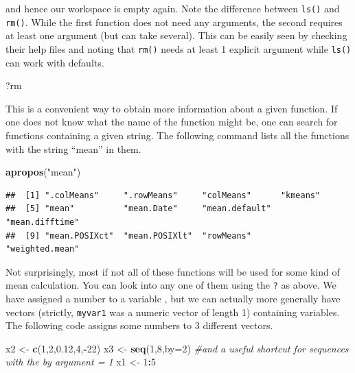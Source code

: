 \documentclass[]{book}
\newenvironment{Shaded}{\begin{snugshade}}{\end{snugshade}}
\newcommand{\KeywordTok}[1]{\textcolor[rgb]{0.13,0.29,0.53}{\textbf{#1}}}
\newcommand{\DataTypeTok}[1]{\textcolor[rgb]{0.13,0.29,0.53}{#1}}
\newcommand{\DecValTok}[1]{\textcolor[rgb]{0.00,0.00,0.81}{#1}}
\newcommand{\FloatTok}[1]{\textcolor[rgb]{0.00,0.00,0.81}{#1}}
\newcommand{\StringTok}[1]{\textcolor[rgb]{0.31,0.60,0.02}{#1}}
\newcommand{\CommentTok}[1]{\textcolor[rgb]{0.56,0.35,0.01}{\textit{#1}}}
\newcommand{\OperatorTok}[1]{\textcolor[rgb]{0.81,0.36,0.00}{\textbf{#1}}}
\newcommand{\NormalTok}[1]{#1}
\theoremstyle{definition}
\theoremstyle{definition}
\theoremstyle{remark}
\begin{document}
and hence our workspace is empty again. Note the difference between
\texttt{ls()} and \texttt{rm()}. While the first function does not need
any arguments, the second requires at least one argument (but can take
several). This can be easily seen by checking their help files and
noting that \texttt{rm()} needs at least 1 explicit argument while
\texttt{ls()} can work with defaults.

\begin{Shaded}
\begin{Highlighting}[]
\NormalTok{?rm}
\end{Highlighting}
\end{Shaded}

This is a convenient way to obtain more information about a given
function. If one does not know what the name of the function might be,
one can search for functions containing a given string. The following
command lists all the functions with the string ``mean'' in them.

\begin{Shaded}
\begin{Highlighting}[]
\KeywordTok{apropos}\NormalTok{(}\StringTok{"mean"}\NormalTok{)}
\end{Highlighting}
\end{Shaded}

\begin{verbatim}
##  [1] ".colMeans"     ".rowMeans"     "colMeans"      "kmeans"       
##  [5] "mean"          "mean.Date"     "mean.default"  "mean.difftime"
##  [9] "mean.POSIXct"  "mean.POSIXlt"  "rowMeans"      "weighted.mean"
\end{verbatim}

Not surprisingly, most if not all of these functions will be used for
some kind of mean calculation. You can look into any one of them using
the \texttt{?} as above. We have assigned a number to a variable , but
we can actually more generally have vectors (strictly, \texttt{myvar1}
was a numeric vector of length 1) containing variables. The following
code assigns some numbers to 3 different vectors.

\begin{Shaded}
\begin{Highlighting}[]
\NormalTok{x2 <-}\StringTok{ }\KeywordTok{c}\NormalTok{(}\DecValTok{1}\NormalTok{,}\DecValTok{2}\NormalTok{,}\FloatTok{0.12}\NormalTok{,}\DecValTok{4}\NormalTok{,}\OperatorTok{-}\DecValTok{22}\NormalTok{)}
\NormalTok{x3 <-}\StringTok{ }\KeywordTok{seq}\NormalTok{(}\DecValTok{1}\NormalTok{,}\DecValTok{8}\NormalTok{,}\DataTypeTok{by=}\DecValTok{2}\NormalTok{)}
\CommentTok{#and a useful shortcut for sequences with the by argument = 1}
\NormalTok{x1 <-}\StringTok{ }\DecValTok{1}\OperatorTok{:}\DecValTok{5}
\end{Highlighting}
\end{Shaded}
\end{document}
